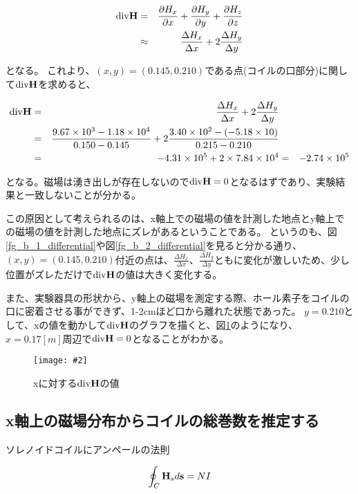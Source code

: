 \documentclass[uplatex,11pt]{jsarticle}
\newcommand{\cir}[3]{ %
    \begin{figure}
        \begin{center}
            \texttt{[image: \#2]}
            \caption{#3}
            \label{fg_#1}
         \end{center}
    \end{figure}
}
\newcommand{\fr}[1]{図\ref{fg_#1}}
\begin{document}
\begin{eqnarray*}
    {\rm div} {\bf H} & = & \frac{\partial H_x}{\partial x} + \frac{\partial H_y}{\partial y} + \frac{\partial H_z}{\partial z} \\
                      & \approx & \frac{\Delta H_x}{\Delta x} + 2\frac{\Delta H_y}{\Delta y}
\end{eqnarray*}

となる。
これより、$(x, y) = (0.145, 0.210)$である点(コイルの口部分)に関して${\rm div} {\bf H}$を求めると、

\begin{eqnarray*}
    {\rm div} {\bf H} & = & \frac{\Delta H_x}{\Delta x} + 2\frac{\Delta H_y}{\Delta y} \\
                      & = & \frac{9.67 \times 10^3 - 1.18 \times 10^4}{0.150 - 0.145} + 2\frac{3.40 \times 10 ^2 - (-5.18 \times 10)}{0.215 - 0.210} \\
                      & = & -4.31 \times 10^5 + 2 \times 7.84 \times 10 ^ 4
                      & = & - 2.74 \times 10^5
\end{eqnarray*}

となる。磁場は湧き出しが存在しないので${\rm div} {\bf H} = 0$となるはずであり、実験結果と一致しないことが分かる。

この原因として考えられるのは、x軸上での磁場の値を計測した地点とy軸上での磁場の値を計測した地点にズレがあるということである。
というのも、\fr{b_1_differential}や\fr{b_2_differential}を見ると分かる通り、$(x, y) = (0.145, 0.210)$付近の点は、$\frac{\Delta H_x}{\Delta x}$、$\frac{\Delta H_y}{\Delta y}$ともに変化が激しいため、少し位置がズレただけで${\rm div} {\bf H}$の値は大きく変化する。

また、実験器具の形状から、y軸上の磁場を測定する際、ホール素子をコイルの口に密着させる事ができず、1-2cmほど口から離れた状態であった。
$y=0.210$として、xの値を動かして${\rm div} {\bf H}$のグラフを描くと、\fr{x_divH}のようになり、$x=0.17[m]$周辺で${\rm div} {\bf H} = 0$となることがわかる。

\cir{x_divH}{./graph/x_divH.png}{ xに対する${\rm div} {\bf H}$の値 }

\subsection{x軸上の磁場分布からコイルの総巻数を推定する}

ソレノイドコイルにアンペールの法則

\[
    \oint_C {\bf H}_s d{\bf s} = NI
\]
\end{document}
